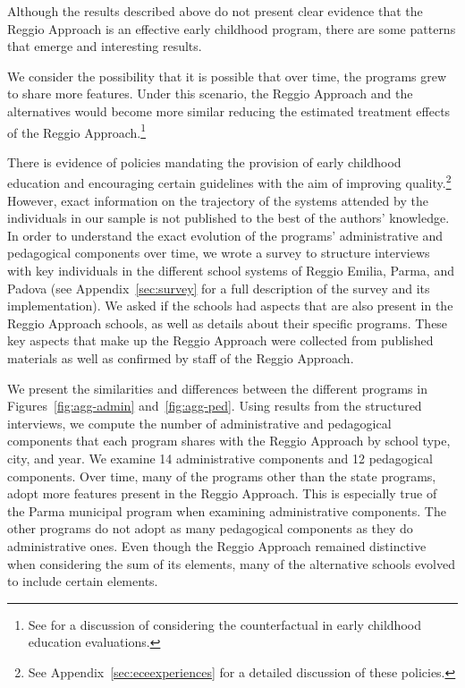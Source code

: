 Although the results described above do not present clear evidence that the Reggio Approach is an effective early childhood program, there are some patterns that emerge and interesting results. 


We consider the possibility that it is possible that over time, the programs grew to share more features. Under this scenario, the Reggio Approach and the alternatives would become more similar reducing the estimated treatment effects of the Reggio Approach.\footnote{See \citet{Elango_Hojman_etal_2016_Early-Edu} for a discussion of considering the counterfactual in early childhood education evaluations.} 

There is evidence of policies mandating the provision of early childhood education and encouraging certain guidelines with the aim of improving quality.\footnote{See Appendix~\ref{sec:eceexperiences} for a detailed discussion of these policies.} However, exact information on the trajectory of the systems attended by the individuals in our sample is not published to the best of the authors' knowledge. In order to understand the exact evolution of the programs' administrative and pedagogical components over time, we wrote a survey to structure interviews with key individuals in the different school systems of Reggio Emilia, Parma, and Padova (see Appendix~\ref{sec:survey} for a full description of the survey and its implementation). We asked if the schools had aspects that are also present in the Reggio Approach schools, as well as details about their specific programs. These key aspects that make up the Reggio Approach were collected from published materials as well as confirmed by staff of the Reggio Approach. 

We present the similarities and differences between the different programs in Figures~\ref{fig:agg-admin} and~\ref{fig:agg-ped}. Using results from the structured interviews, we compute the number of administrative and pedagogical components that each program shares with the Reggio Approach by school type, city, and year. We examine 14 administrative components and 12 pedagogical components. Over time, many of the programs other than the state programs, adopt more features present in the Reggio Approach. This is especially true of the Parma municipal program when examining administrative components. The other programs do not adopt as many pedagogical components as they do administrative ones. Even though the Reggio Approach remained distinctive when considering the sum of its elements, many of the alternative schools evolved to include certain elements.

